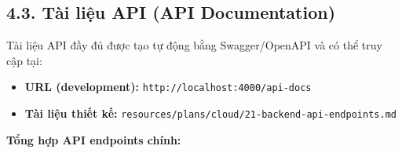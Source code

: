 \documentclass[13pt,a4paper]{extarticle}
\renewcommand{\\}{\thesislongtableorignewline\hline}%
\providecommand{\tightlist}{%
  \setlength{\itemsep}{0pt}\setlength{\parskip}{0pt}}
\begin{document}
\subsection{4.3. Tài liệu API (API
Documentation)}\label{43-tuxe0i-liux1ec7u-api-api-documentation}

Tài liệu API đầy đủ được tạo tự động bằng Swagger/OpenAPI và có thể truy
cập tại:

\begin{itemize}
\tightlist
\item
  \textbf{URL (development):} \texttt{http://localhost:4000/api-docs}
\item
  \textbf{Tài liệu thiết kế:}
  \texttt{resources/plans/cloud/21-backend-api-endpoints.md}
\end{itemize}

\textbf{Tổng hợp API endpoints chính:}
\end{document}
